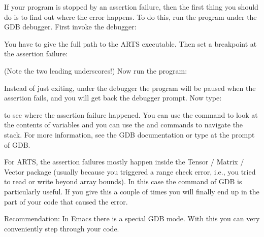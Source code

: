 If your program is stopped by an assertion failure, then the first
thing you should do is to find out where the error happens. To do
this, run the program under the GDB debugger. First invoke
the debugger:
\begin{quote}
\end{quote}
You have to give the full path to the ARTS executable.  Then set a
breakpoint at the assertion failure:
\begin{quote}
\end{quote}
(Note the two leading underscores!) Now run the program: 
\begin{quote}
\end{quote}

Instead of just exiting, under the debugger the program will be paused
when the assertion fails, and you will get back the debugger prompt.
Now type:
\begin{quote}
\end{quote}  
to see where the assertion failure happened. You can use the
 command to look at the contents of variables and you
can use the  and  commands to navigate
the stack.  For more information, see the GDB documentation or type
 at the prompt of GDB.

For ARTS, the assertion failures mostly happen inside the Tensor /
Matrix / Vector package (usually because you triggered a range check
error, i.e., you tried to read or write beyond array bounds). In this
case the  command of GDB is particularly useful. If you
give this a couple of times you will finally end up in the part of
your code that caused the error.

Recommendation: In Emacs there is a special GDB mode. With this you
can very conveniently step through your code.

